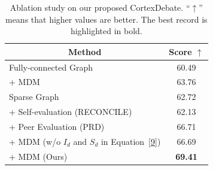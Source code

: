 \begin{table}
  \centering
  \setlength{\tabcolsep}{0mm}
\begin{tabular}{lc}
\toprule
\multicolumn{1}{c}{Method}               & Score $\uparrow$ \\ \midrule
Fully-connected Graph     & 60.49         \\
+ MDM                & 63.76         \\ \midrule
Sparse Graph       & 62.72         \\
+ Self-evaluation (RECONCILE) & 62.13     \\
+ Peer Evaluation (PRD) & 66.71     \\
+ MDM (w/o $I_{d}$ and $S_{d}$ in Equation~\eqref{9}) & 66.69     \\
+ MDM (Ours) & \textbf{69.41}     \\ \bottomrule
\end{tabular}
  \caption{\label{each_part}
   Ablation study on our proposed CortexDebate. ``$\uparrow$'' means that higher values are better. The best record is highlighted in bold.
  }
\end{table}